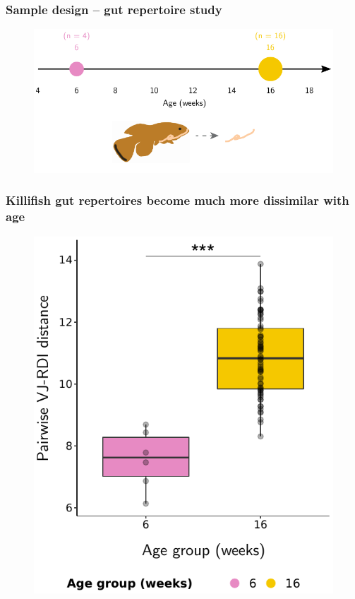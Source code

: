 \documentclass[presentation]{beamer}
\newlength{\slideheight}
\begin{document}
\begin{frame}
\frametitle{Sample design -- gut repertoire study}
\begin{figure}
\includegraphics[width=\textwidth]{figs/pdf/design-gut}
\end{figure}
\end{frame}

\begin{frame}
\frametitle{Killifish gut repertoires become much more dissimilar with age}
\begin{figure}
\includegraphics[height=\slideheight]{figs/pdf/igseq-gut-rdi}
\end{figure} 
\end{frame}
\end{document}

